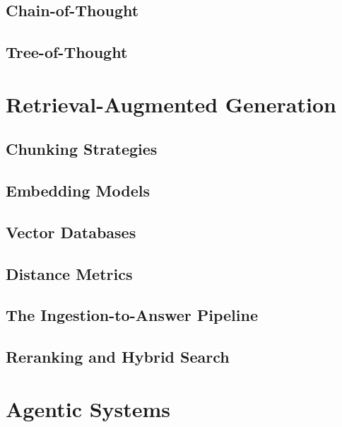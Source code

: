 \subsection{Chain-of-Thought}

\subsection{Tree-of-Thought}

\section{Retrieval-Augmented Generation}
\label{sec:rag}

\subsection{Chunking Strategies}

\subsection{Embedding Models}

\subsection{Vector Databases}


\subsection{Distance Metrics}


\subsection{The Ingestion-to-Answer Pipeline}

\subsection{Reranking and Hybrid Search}

\section{Agentic Systems}
\label{sec:agents}

